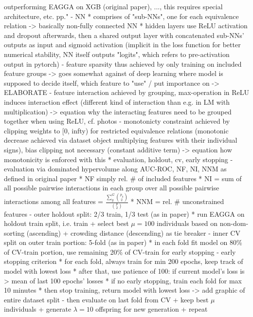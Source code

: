 \documentclass[twoside,11pt]{article}
\begin{document}
      outperforming EAGGA on XGB (original paper), ..., this requires special architecture, etc. pp."
    - NN
      * comprises of "sub-NNs", one for each equivalence relation -> basically non-fully connected NN
      * hidden layers use ReLU activation and dropout afterwards, then a shared output layer with concatenated sub-NNs' outputs as input and sigmoid activation
        (implicit in the loss function for better numerical stability, NN itself outputs "logits", which refers to pre-activation output in pytorch)
    - feature sparsity thus achieved by only training on included feature groups -> goes somewhat against of deep learning where model is supposed to decide itself,
      which feature to "use" / put importance on -> ELABORATE
    - feature interaction achieved by grouping, max-operation in ReLU induces interaction effect (different kind of interaction than e.g. in LM with multiplication)
      -> equation why the interacting features need to be grouped together when using ReLU, cf. photos
    - monotonicty constraint achieved by clipping weights to [0, infty) for restricted equivalence relations (monotonic decrease achieved via dataset object multiplying
      features with their individual signs), bias clipping not necessary (constant additive term)
      -> equation how monotonicity is enforced with this
  * evaluation, holdout, cv, early stopping
    - evaluation via dominated hypervolume along AUC-ROC, NF, NI, NNM as defined in original paper
      * NF simply rel. \# of included features
      * NI = sum of all possible pairwise interactions in each group over all possible pairwise interactions among all features = $\frac{\sum_g^G {p_g \choose 2}}{{p \choose 2}}$
      * NNM = rel. \# unconstrained features
    - outer holdout split: 2/3 train, 1/3 test (as in paper)
      * run EAGGA on holdout train split, i.e. train + select best $\mu=100$ individuals based on non-dom-sorting (ascending) + crowding distance (descending) as tie breaker
    - inner CV split on outer train portion: 5-fold (as in paper)
      * in each fold fit model on 80\% of CV-train portion, use remaining 20\% of CV-train for early stopping
    - early stopping criterion
      * for each fold, always train for min 200 epochs, keep track of model with lowest loss
      * after that, use patience of 100: if current model's loss is > mean of last 100 epochs' losses
      * if no early stopping, train each fold for max 10 minutes
      * then stop training, return model with lowest loss
    -> add graphic of entire dataset split
    - then evaluate on last fold from CV + keep best $\mu$ individuals + generate $\lambda=10$ offspring for new generation + repeat
\end{document}
